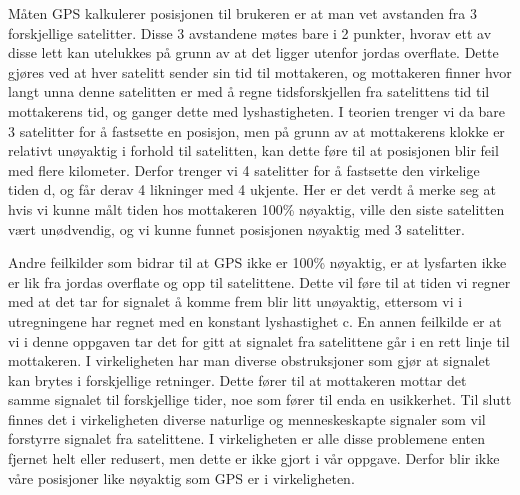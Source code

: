 Måten GPS kalkulerer posisjonen til brukeren er at man vet avstanden fra 3 forskjellige satelitter. Disse 3 avstandene møtes bare i 2 punkter, hvorav ett av disse lett kan utelukkes på grunn av at det ligger utenfor jordas overflate. Dette gjøres ved at hver satelitt sender sin tid til mottakeren, og mottakeren finner hvor langt unna denne satelitten er med å regne tidsforskjellen fra satelittens tid til mottakerens tid, og ganger dette med lyshastigheten. I teorien trenger vi da bare 3 satelitter for å fastsette en posisjon, men på grunn av at mottakerens klokke er relativt unøyaktig i forhold til satelitten, kan dette føre til at posisjonen blir feil med flere kilometer. Derfor trenger vi 4 satelitter for å fastsette den virkelige tiden d, og får derav 4 likninger med 4 ukjente. Her er det verdt å merke seg at hvis vi kunne målt tiden hos mottakeren 100\% nøyaktig, ville den siste satelitten vært unødvendig, og vi kunne funnet posisjonen nøyaktig med 3 satelitter. 

\vspace{5mm}

Andre feilkilder som bidrar til at GPS ikke er 100\% nøyaktig, er at lysfarten ikke er lik fra jordas overflate og opp til satelittene. Dette vil føre til at tiden vi regner med at det tar for signalet å komme frem blir litt unøyaktig, ettersom vi i utregningene har regnet med en konstant lyshastighet c. En annen feilkilde er at vi i denne oppgaven tar det for gitt at signalet fra satelittene går i en rett linje til mottakeren. I virkeligheten har man diverse obstruksjoner som gjør at signalet kan brytes i forskjellige retninger. Dette fører til at mottakeren mottar det samme signalet til forskjellige tider, noe som fører til enda en usikkerhet. Til slutt finnes det i virkeligheten diverse naturlige og menneskeskapte signaler som vil forstyrre signalet fra satelittene. I virkeligheten er alle disse problemene enten fjernet helt eller redusert, men dette er ikke gjort i vår oppgave. Derfor blir ikke våre posisjoner like nøyaktig som GPS er i virkeligheten. 